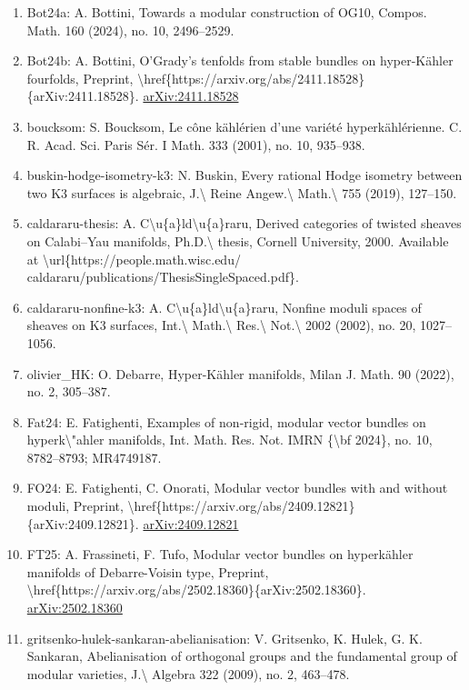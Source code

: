 \documentclass[11pt]{article}
\begin{document}
\begin{enumerate}[leftmargin=*]
  \item Bot24a: A. Bottini, Towards a modular construction of OG10, Compos. Math. 160 (2024), no. 10, 2496--2529.
  \item Bot24b: A. Bottini, O'Grady's tenfolds from stable bundles on hyper-Kähler fourfolds, Preprint, \textbackslash{}href\{https://arxiv.org/abs/2411.18528\}\{arXiv:2411.18528\}. \href{https://arxiv.org/abs/2411.18528}{arXiv:2411.18528}
  \item boucksom: S. Boucksom, Le cône kählérien d'une variété hyperkählérienne. C. R. Acad. Sci. Paris Sér. I Math. 333 (2001), no. 10, 935--938.
  \item buskin-hodge-isometry-k3: N. Buskin, Every rational Hodge isometry between two K3 surfaces is algebraic, J.\textbackslash{} Reine Angew.\textbackslash{} Math.\textbackslash{} 755 (2019), 127--150.
  \item caldararu-thesis: A. C\textbackslash{}u\{a\}ld\textbackslash{}u\{a\}raru, Derived categories of twisted sheaves on Calabi--Yau manifolds, Ph.D.\textbackslash{} thesis, Cornell University, 2000. Available at \textbackslash{}url\{https://people.math.wisc.edu/ caldararu/publications/ThesisSingleSpaced.pdf\}.
  \item caldararu-nonfine-k3: A. C\textbackslash{}u\{a\}ld\textbackslash{}u\{a\}raru, Nonfine moduli spaces of sheaves on K3 surfaces, Int.\textbackslash{} Math.\textbackslash{} Res.\textbackslash{} Not.\textbackslash{} 2002 (2002), no. 20, 1027--1056.
  \item olivier\_HK: O. Debarre, Hyper-Kähler manifolds, Milan J. Math. 90 (2022), no. 2, 305--387.
  \item Fat24: E. Fatighenti, Examples of non-rigid, modular vector bundles on hyperk\textbackslash{}"ahler manifolds, Int. Math. Res. Not. IMRN \{\textbackslash{}bf 2024\}, no. 10, 8782--8793; MR4749187.
  \item FO24: E. Fatighenti, C. Onorati, Modular vector bundles with and without moduli, Preprint, \textbackslash{}href\{https://arxiv.org/abs/2409.12821\}\{arXiv:2409.12821\}. \href{https://arxiv.org/abs/2409.12821}{arXiv:2409.12821}
  \item FT25: A. Frassineti, F. Tufo, Modular vector bundles on hyperkähler manifolds of Debarre-Voisin type, Preprint, \textbackslash{}href\{https://arxiv.org/abs/2502.18360\}\{arXiv:2502.18360\}. \href{https://arxiv.org/abs/2502.18360}{arXiv:2502.18360}
  \item gritsenko-hulek-sankaran-abelianisation: V. Gritsenko, K. Hulek, G. K. Sankaran, Abelianisation of orthogonal groups and the fundamental group of modular varieties, J.\textbackslash{} Algebra 322 (2009), no. 2, 463--478.

\end{enumerate}
\end{document}
